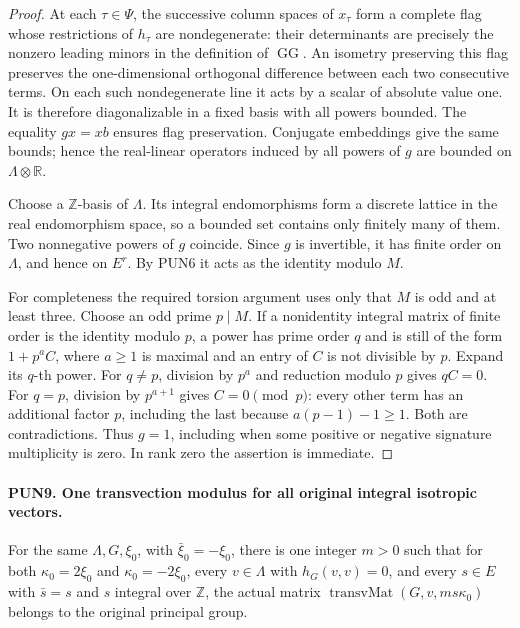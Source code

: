 \begin{proof}
At each \(\tau\in\Psi\), the successive column spaces of
\(x_\tau\) form a complete flag whose restrictions of
\(h_\tau\) are nondegenerate: their determinants are precisely
the nonzero leading minors in the definition of \(\operatorname{GG}\).
An isometry preserving this flag preserves the one-dimensional
orthogonal difference between each two consecutive terms.  On
each such nondegenerate line it acts by a scalar of absolute value
one.  It is therefore diagonalizable in a fixed basis with all
powers bounded.  The equality \(g x=x b\) ensures flag
preservation.  Conjugate embeddings give the same bounds; hence
the real-linear operators induced by all powers of \(g\) are
bounded on \(\Lambda\otimes\mathbb R\).

Choose a \(\mathbb Z\)-basis of \(\Lambda\).  Its integral
endomorphisms form a discrete lattice in the real endomorphism
space, so a bounded set contains only finitely many of them.
Two nonnegative powers of \(g\) coincide.  Since \(g\) is
invertible, it has finite order on \(\Lambda\), and hence on
\(E^r\).  By PUN6 it acts as the identity modulo \(M\).

For completeness the required torsion argument uses only that
\(M\) is odd and at least three.  Choose an odd prime \(p\mid M\).
If a nonidentity integral matrix of finite order is the identity
modulo \(p\), a power has prime order \(q\) and is still of
the form \(1+p^a C\), where \(a\ge1\) is maximal and an entry
of \(C\) is not divisible by \(p\).  Expand its \(q\)-th power.
For \(q\ne p\), division by \(p^a\) and reduction modulo \(p\)
gives \(qC=0\).  For \(q=p\), division by \(p^{a+1}\) gives
\(C=0\pmod p\): every other term has an additional factor
\(p\), including the last because \(a(p-1)-1\ge1\).
Both are contradictions.  Thus \(g=1\), including when some
positive or negative signature multiplicity is zero.  In rank
zero the assertion is immediate.
\end{proof}

\paragraph{PUN9. One transvection modulus for all original integral isotropic vectors.}
\label{claim:PUN9}
For the same \(\Lambda,G,\xi_0\), with
\(\bar\xi_0=-\xi_0\), there is one integer \(m>0\) such that
for both \(\kappa_0=2\xi_0\) and \(\kappa_0=-2\xi_0\),
every \(v\in\Lambda\) with \(h_G(v,v)=0\), and every
\(s\in E\) with \(\bar s=s\) and \(s\) integral over
\(\mathbb Z\), the actual matrix
\(\operatorname{transvMat}(G,v,ms\kappa_0)\) belongs to the
original principal group.

